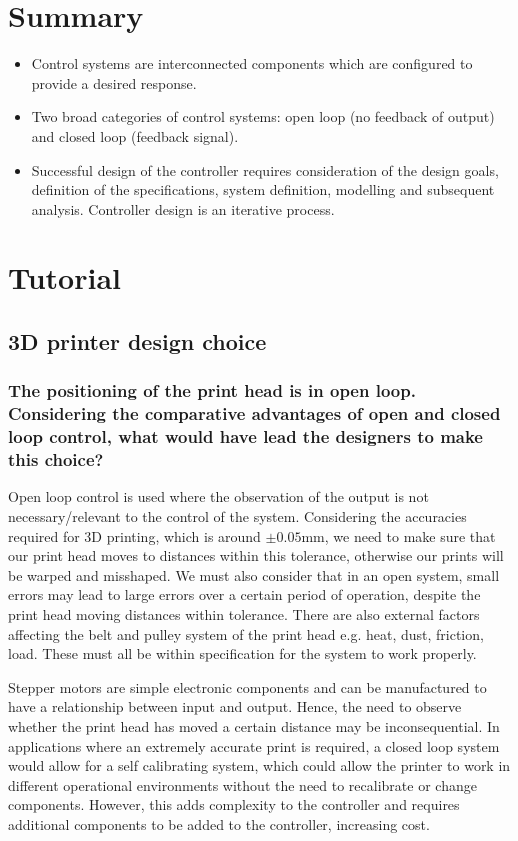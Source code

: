 \documentclass[class=report, crop=false, 12pt,a4paper]{standalone}
\begin{document}
\section{Summary}
\begin{itemize}
  \item Control systems are interconnected components which are configured to provide a desired response.
  \item Two broad categories of control systems: open loop (no feedback of output) and closed loop (feedback signal).
  \item Successful design of the controller requires consideration of the design goals, definition of the specifications, system definition, modelling and subsequent analysis. Controller design is an iterative process.
\end{itemize}
\section{Tutorial}
\subsection*{3D printer design choice}
\subsubsection*{The positioning of the print head is in open loop. Considering the comparative advantages of open and closed loop control, what would have lead the designers to make this choice?}
Open loop control is used where the observation of the output is not necessary/relevant to the control of the system. Considering the accuracies required for 3D printing, which is around $\pm 0.05 \si{\milli\m}$, we need to make sure that our print head moves to distances within this tolerance, otherwise our prints will be warped and misshaped. We must also consider that in an open system, small errors may lead to large errors over a certain period of operation, despite the print head moving distances within tolerance. There are also external factors affecting the belt and pulley system of the print head e.g. heat, dust, friction, load. These must all be within specification for the system to work properly.

Stepper motors are simple electronic components and can be manufactured to have a relationship between input and output. Hence, the need to observe whether the print head has moved a certain distance may be inconsequential. In applications where an extremely accurate print is required, a closed loop system would allow for a self calibrating system, which could allow the printer to work in different operational environments without the need to recalibrate or change components. However, this adds complexity to the controller and requires additional components to be added to the controller, increasing cost. 
\end{document}
